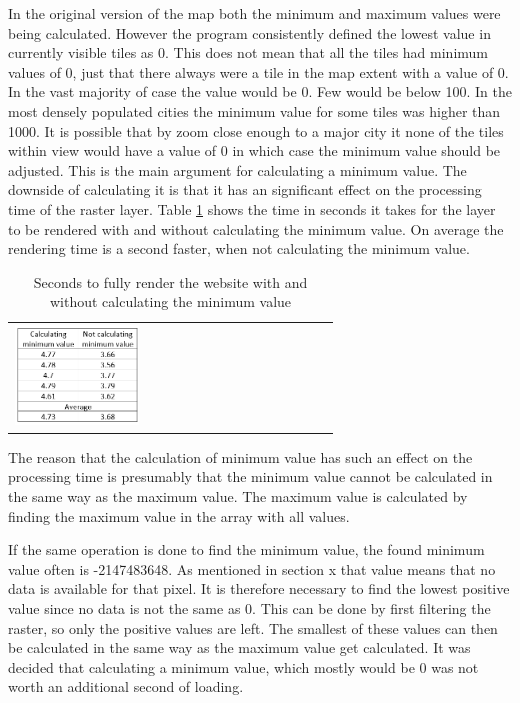 In the original version of the map both the minimum and maximum values were being calculated. However the program consistently defined the lowest value in currently visible tiles as 0.
This does not mean that all the tiles had minimum values of 0, just that there always were a tile in the map extent with a value of 0. In the vast majority of case the value would be 0. Few would be below 100. In the most densely populated cities the minimum value for some tiles was higher than 1000. 
It is possible that by zoom close enough to a major city it none of the tiles within view would have a value of 0 in which case the minimum value should be adjusted.
This is the main argument for calculating a minimum value. The downside of calculating it is that it has an significant effect on the processing time of the raster layer. Table \ref{tabMinimum} shows the time in seconds it takes for the layer to be rendered with and without calculating the minimum value. On average the rendering time is a second faster, when not calculating the minimum value.
\begin{table}[htbp]
	\centering
	\begin{tabular}{l}
		\includegraphics[width=0.4\textwidth]{Pictures/tabMinimum}
	\end{tabular}
	\caption{Seconds to fully render the website with and without calculating the minimum value}
	\label{tabMinimum}
\end{table}

The reason that the calculation of minimum value has such an effect on the processing time is presumably that the minimum value cannot be calculated in the same way as the maximum value. 
The maximum value is calculated by finding the maximum value in the array with all values. 


If the same operation is done to find the minimum value, the found minimum value often is -2147483648. As mentioned in section x that value means that no data is available for that pixel. 
It is therefore necessary to find the lowest positive value since no data is not the same as 0. This can be done by first filtering the raster, so only the positive values are left. The smallest of these values can then be calculated in the same way as the maximum value get calculated. 
It was decided that calculating a minimum value, which mostly would be 0 was not worth an additional second of loading. 


